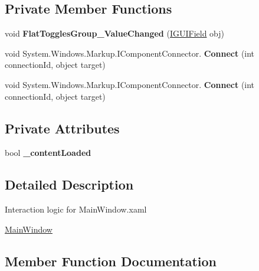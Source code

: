 \subsection*{Private Member Functions}
\begin{DoxyCompactItemize}
\item 
\mbox{\label{class_toggles_group_example_1_1_main_window_ab6d4f8895b58d818eef5558d6e4e55b1}} 
void {\bfseries Flat\+Toggles\+Group\+\_\+\+Value\+Changed} (\mbox{\hyperlink{interface_wpf_handler_1_1_u_i_1_1_auto_layout_1_1_i_g_u_i_field}{I\+G\+U\+I\+Field}} obj)
\item 
\mbox{\label{class_toggles_group_example_1_1_main_window_ab711972a609dfc5b820b896c7487c8be}} 
void System.\+Windows.\+Markup.\+I\+Component\+Connector. {\bfseries Connect} (int connection\+Id, object target)
\item 
\mbox{\label{class_toggles_group_example_1_1_main_window_ab711972a609dfc5b820b896c7487c8be}} 
void System.\+Windows.\+Markup.\+I\+Component\+Connector. {\bfseries Connect} (int connection\+Id, object target)
\end{DoxyCompactItemize}
\subsection*{Private Attributes}
\begin{DoxyCompactItemize}
\item 
\mbox{\label{class_toggles_group_example_1_1_main_window_ad2e05a4a8d90c6c253dceb13f523be09}} 
bool {\bfseries \+\_\+content\+Loaded}
\end{DoxyCompactItemize}


\subsection{Detailed Description}
Interaction logic for Main\+Window.\+xaml 

\mbox{\hyperlink{class_toggles_group_example_1_1_main_window}{Main\+Window}} 

\subsection{Member Function Documentation}
\mbox{\label{class_toggles_group_example_1_1_main_window_a8e4c4a18cf57fc212c12a5394a6c0f77}} 

